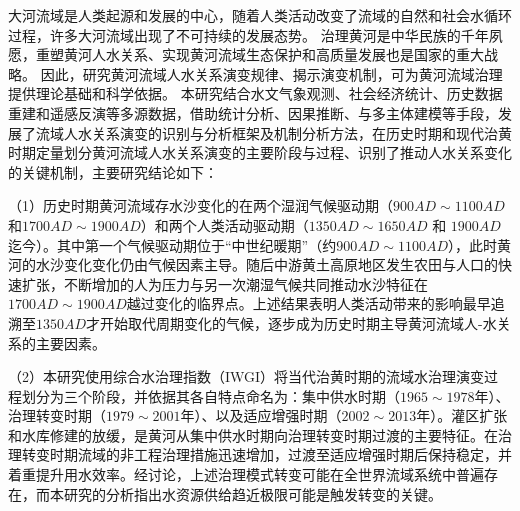 \begin{cabstract}



大河流域是人类起源和发展的中心，随着人类活动改变了流域的自然和社会水循环过程，许多大河流域出现了不可持续的发展态势。
治理黄河是中华民族的千年夙愿，重塑黄河人水关系、实现黄河流域生态保护和高质量发展也是国家的重大战略。
因此，研究黄河流域人水关系演变规律、揭示演变机制，可为黄河流域治理提供理论基础和科学依据。
本研究结合水文气象观测、社会经济统计、历史数据重建和遥感反演等多源数据，借助统计分析、因果推断、与多主体建模等手段，发展了流域人水关系演变的识别与分析框架及机制分析方法，在历史时期和现代治黄时期定量划分黄河流域人水关系演变的主要阶段与过程、识别了推动人水关系变化的关键机制，主要研究结论如下：

（1）历史时期黄河流域存水沙变化的在两个湿润气候驱动期（$900AD\sim1100AD$和$1700AD\sim1900AD$）和两个人类活动驱动期（$1350AD \sim 1650AD$ 和 $1900AD$迄今）。其中第一个气候驱动期位于“中世纪暖期”（约$900AD \sim 1100AD$），此时黄河的水沙变化变化仍由气候因素主导。随后中游黄土高原地区发生农田与人口的快速扩张，不断增加的人为压力与另一次潮湿气候共同推动水沙特征在$1700AD \sim 1900AD$越过变化的临界点。上述结果表明人类活动带来的影响最早追溯至$1350AD$才开始取代周期变化的气候，逐步成为历史时期主导黄河流域人-水关系的主要因素。

（2）本研究使用综合水治理指数（IWGI）将当代治黄时期的流域水治理演变过程划分为三个阶段，并依据其各自特点命名为：集中供水时期（$1965 \sim 1978$年）、治理转变时期（$1979 \sim 2001$年）、以及适应增强时期（$2002 \sim 2013$年）。灌区扩张和水库修建的放缓，是黄河从集中供水时期向治理转变时期过渡的主要特征。在治理转变时期流域的非工程治理措施迅速增加，过渡至适应增强时期后保持稳定，并着重提升用水效率。经讨论，上述治理模式转变可能在全世界流域系统中普遍存在，而本研究的分析指出水资源供给趋近极限可能是触发转变的关键。


\end{cabstract}
